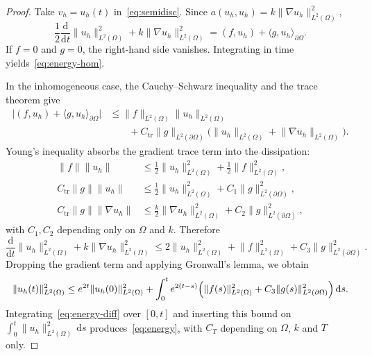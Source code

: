 \documentclass[final,3p,times]{elsarticle}
\theoremstyle{plain}
\theoremstyle{definition}
\theoremstyle{remark}
\newcommand{\dd}{\mathrm{d}}
\begin{document}
\begin{proof}
Take $v_h=u_h(t)$ in~\eqref{eq:semidisc}. Since
$a(u_h,u_h)=k\lVert\nabla u_h\rVert_{L^2(\Omega)}^2$,
\begin{equation}
\label{eq:energy-id}
\frac12\frac{\dd}{\dd t}\lVert u_h\rVert_{L^2(\Omega)}^2
+k\lVert\nabla u_h\rVert_{L^2(\Omega)}^2
=(f,u_h)+\langle g,u_h\rangle_{\partial\Omega}.
\end{equation}
If $f=0$ and $g=0$, the right-hand side vanishes. Integrating in time
yields~\eqref{eq:energy-hom}.

In the inhomogeneous case, the Cauchy--Schwarz inequality and the trace
theorem give
\begin{equation}
\begin{aligned}
\bigl\lvert(f,u_h)+\langle g,u_h\rangle_{\partial\Omega}\bigr\rvert
&\le
\lVert f\rVert_{L^2(\Omega)}\lVert u_h\rVert_{L^2(\Omega)}\\
&\qquad
+C_{\mathrm{tr}}\lVert g\rVert_{L^2(\partial\Omega)}
\bigl(\lVert u_h\rVert_{L^2(\Omega)}+\lVert\nabla u_h\rVert_{L^2(\Omega)}\bigr).
\end{aligned}
\end{equation}
Young's inequality absorbs the gradient trace term into the dissipation:
\begin{equation}
\begin{aligned}
\lVert f\rVert\lVert u_h\rVert
&\le \tfrac12\lVert u_h\rVert_{L^2(\Omega)}^2+\tfrac12\lVert f\rVert_{L^2(\Omega)}^2,\\
C_{\mathrm{tr}}\lVert g\rVert\lVert u_h\rVert
&\le \tfrac12\lVert u_h\rVert_{L^2(\Omega)}^2+C_1\lVert g\rVert_{L^2(\partial\Omega)}^2,\\
C_{\mathrm{tr}}\lVert g\rVert\lVert\nabla u_h\rVert
&\le \tfrac{k}{2}\lVert\nabla u_h\rVert_{L^2(\Omega)}^2
+C_2\lVert g\rVert_{L^2(\partial\Omega)}^2,
\end{aligned}
\end{equation}
with $C_1,C_2$ depending only on $\Omega$ and $k$. Therefore
\begin{equation}
\label{eq:energy-diff}
\frac{\dd}{\dd t}\lVert u_h\rVert_{L^2(\Omega)}^2
+k\lVert\nabla u_h\rVert_{L^2(\Omega)}^2
\le
2\lVert u_h\rVert_{L^2(\Omega)}^2
+\lVert f\rVert_{L^2(\Omega)}^2
+C_3\lVert g\rVert_{L^2(\partial\Omega)}^2.
\end{equation}
Dropping the gradient term and applying Gronwall's lemma, we obtain
\begin{equation}
\lVert u_h(t)\rVert_{L^2(\Omega)}^2
\le
e^{2t}\lVert u_h(0)\rVert_{L^2(\Omega)}^2
+\int_0^t e^{2(t-s)}
\Bigl(\lVert f(s)\rVert_{L^2(\Omega)}^2
+C_3\lVert g(s)\rVert_{L^2(\partial\Omega)}^2\Bigr)\,\dd s.
\end{equation}
Integrating~\eqref{eq:energy-diff} over $[0,t]$ and inserting this bound on
$\int_0^t\lVert u_h\rVert_{L^2(\Omega)}^2\,\dd s$ produces~\eqref{eq:energy},
with $C_T$ depending on $\Omega$, $k$ and $T$ only.
\end{proof}
\end{document}
